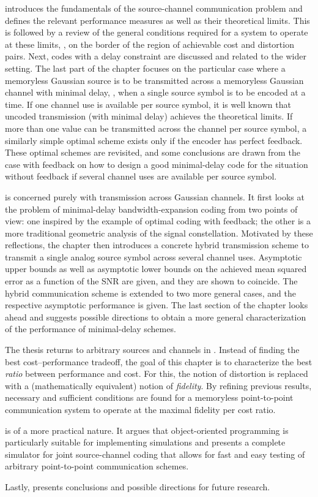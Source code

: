  introduces the fundamentals of the source-channel
communication problem and defines the relevant performance measures as well as
their theoretical limits.  This is followed by a review of the general
conditions required for a system to operate at these limits, \ie, on the border
of the region of achievable cost and distortion pairs. Next, codes with a delay
constraint are discussed and related to the wider setting. The last part of the
chapter focuses on the particular case where a memoryless Gaussian source is to
be transmitted across a memoryless Gaussian channel with minimal delay, \ie,
when a single source symbol is to be encoded at a time. If one channel use is
available per source symbol, it is well known that uncoded transmission (with
minimal delay) achieves the theoretical limits. If more than one value can be
transmitted across the channel per source symbol, a similarly simple optimal
scheme exists only if the encoder has perfect feedback. These optimal schemes
are revisited, and some conclusions are drawn from the case with feedback on how
to design a good minimal-delay code for the situation without feedback if
several channel uses are available per source symbol.

 is concerned purely with transmission across Gaussian
channels. It first looks at the problem of minimal-delay bandwidth-expansion
coding from two points of view: one inspired by the example of optimal coding
with feedback; the other is a more traditional geometric analysis of the signal
constellation. Motivated by these reflections, the chapter then introduces a
concrete hybrid transmission scheme to transmit a single analog source symbol
across several channel uses.  Asymptotic upper bounds as well as asymptotic
lower bounds on the achieved mean squared error as a function of the SNR are
given, and they are shown to coincide. The hybrid communication scheme is
extended to two more general cases, and the respective asymptotic performance is
given. The last section of the chapter looks ahead and suggests possible
directions to obtain a more general characterization of the performance of
minimal-delay schemes. 

The thesis returns to arbitrary sources and channels in .
Instead of finding the best cost--performance tradeoff, the goal of this chapter
is to characterize the best \emph{ratio} between performance and cost. For this,
the notion of distortion is replaced with a (mathematically equivalent) notion
of \emph{fidelity}. By refining previous results, necessary and sufficient
conditions are found for a memoryless point-to-point communication system to
operate at the maximal fidelity per cost ratio. 

 is of a more practical nature. It argues that
object-oriented programming is particularly suitable for implementing
simulations and presents a complete simulator for joint source-channel coding
that allows for fast and easy testing of arbitrary point-to-point communication
schemes. 

Lastly,  presents conclusions and possible directions for
future research.

